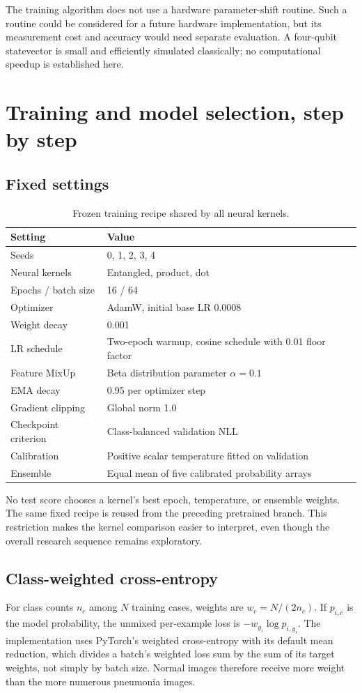 \documentclass[11pt,a4paper]{report}
\begin{document}
The training algorithm does not use a hardware parameter-shift routine. Such a routine could be considered for a future hardware implementation, but its measurement cost and accuracy would need separate evaluation. A four-qubit statevector is small and efficiently simulated classically; no computational speedup is established here.

\chapter{Training and model selection, step by step}
\section{Fixed settings}
\begin{table}[htbp]\centering
\begin{tabular}{ll}\toprule
Setting & Value\\\midrule
Seeds & 0, 1, 2, 3, 4\\
Neural kernels & Entangled, product, dot\\
Epochs / batch size & 16 / 64\\
Optimizer & AdamW, initial base LR 0.0008\\
Weight decay & 0.001\\
LR schedule & Two-epoch warmup, cosine schedule with 0.01 floor factor\\
Feature MixUp & Beta distribution parameter $\alpha=0.1$\\
EMA decay & 0.95 per optimizer step\\
Gradient clipping & Global norm 1.0\\
Checkpoint criterion & Class-balanced validation NLL\\
Calibration & Positive scalar temperature fitted on validation\\
Ensemble & Equal mean of five calibrated probability arrays\\\bottomrule
\end{tabular}
\caption{Frozen training recipe shared by all neural kernels.}
\end{table}
No test score chooses a kernel's best epoch, temperature, or ensemble weights. The same fixed recipe is reused from the preceding pretrained branch. This restriction makes the kernel comparison easier to interpret, even though the overall research sequence remains exploratory.

\section{Class-weighted cross-entropy}
For class counts $n_c$ among $N$ training cases, weights are $w_c=N/(2n_c)$. If $p_{i,c}$ is the model probability, the unmixed per-example loss is $-w_{y_i}\log p_{i,y_i}$. The implementation uses PyTorch's weighted cross-entropy with its default mean reduction, which divides a batch's weighted loss sum by the sum of its target weights, not simply by batch size. Normal images therefore receive more weight than the more numerous pneumonia images.
\end{document}
